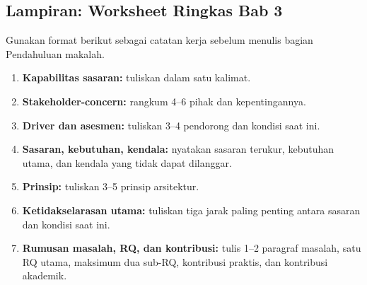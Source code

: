 \subsection*{Lampiran: Worksheet Ringkas Bab 3}

Gunakan format berikut sebagai catatan kerja sebelum menulis bagian Pendahuluan
makalah.

\begin{enumerate}
  \item \textbf{Kapabilitas sasaran:} tuliskan dalam satu kalimat.
  \item \textbf{Stakeholder-concern:} rangkum 4--6 pihak dan kepentingannya.
  \item \textbf{Driver dan asesmen:} tuliskan 3--4 pendorong dan kondisi saat
        ini.
  \item \textbf{Sasaran, kebutuhan, kendala:} nyatakan sasaran terukur,
        kebutuhan utama, dan kendala yang tidak dapat dilanggar.
  \item \textbf{Prinsip:} tuliskan 3--5 prinsip arsitektur.
  \item \textbf{Ketidakselarasan utama:} tuliskan tiga jarak paling penting
        antara sasaran dan kondisi saat ini.
  \item \textbf{Rumusan masalah, RQ, dan kontribusi:} tulis 1--2 paragraf
        masalah, satu RQ utama, maksimum dua sub-RQ, kontribusi praktis, dan
        kontribusi akademik.
\end{enumerate}

